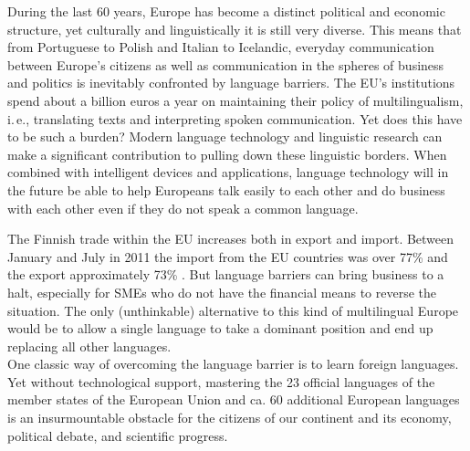 \begin{multicols}{2}

During the last 60 years, Europe has become a distinct political and
economic structure, yet culturally and linguistically it is still very
diverse. This means that from Portuguese to Polish and Italian
to Icelandic, everyday communication between Europe’s citizens
as well as communication in the spheres of business and politics is
inevitably confronted by language barriers. The EU’s institutions
spend about a billion euros a year on maintaining their policy of
multilingualism, i.\,e., translating texts and interpreting spoken
communication. Yet does this have to be such a burden?  Modern
language technology and linguistic research can make a significant
contribution to pulling down these linguistic borders. When combined
with intelligent devices and applications, language technology will in
the future be able to help Europeans talk easily to each other and do
business with each other even if they do not speak a common language.

The Finnish trade within the EU increases both in export and
import. Between January and July in 2011 the import from the EU
countries was over 77\% and the export approximately 73\%
\cite{SVT}. But language barriers can bring business to a halt,
especially for SMEs who do not have the financial means to reverse the
situation. The only (unthinkable) alternative to this kind of
multilingual Europe would be to allow a single language to take a
dominant position and end up replacing all other languages.\\
One classic way of overcoming the language barrier is to learn foreign
languages. Yet without technological support, mastering the 23
official languages of the member states of the European Union and
ca. 60 additional European languages is an insurmountable obstacle for
the citizens of our continent and its economy, political debate, and
scientific progress.


\end{multicols}
